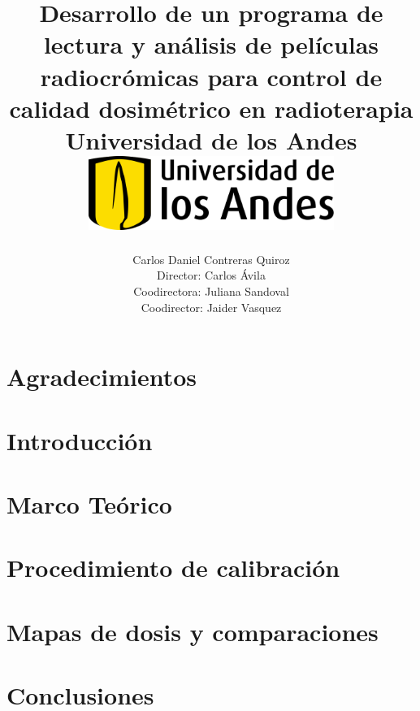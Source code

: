 \documentclass[12pt]{report}
\title 
{
	{Desarrollo de un programa de lectura y análisis de películas radiocrómicas para control de calidad dosimétrico en radioterapia}\\
	{\large Universidad de los Andes}\\
	\vspace{1.5cm}
	{\includegraphics[width = 0.6\textwidth]{logo.png}}	
}
\author{Carlos Daniel Contreras Quiroz\\[1cm]{\small Director: Carlos \'Avila}\\[1cm]{\small Coodirectora: Juliana Sandoval}\\[1cm]{\small Coodirector: Jaider Vasquez}}
\newenvironment{dedication}
  {\clearpage           %
   \thispagestyle{empty}%
   \vspace*{\stretch{1}}%
   \raggedleft          %
  }
  {\par %
   \vspace{\stretch{3}} %
   \clearpage           %
  }
\theoremstyle{definition}
\begin{document}

\maketitle


\begin{abstract}



\end{abstract}

\begin{otherlanguage}{english}
\begin{abstract}


\end{abstract}
\end{otherlanguage}

\newpage

\chapter*{Agradecimientos}


\tableofcontents

\listoffigures

\chapter{Introducción}


\chapter{Marco Teórico}\label{chp:teorico}


\chapter{Procedimiento de calibración}\label{chp:Calibracion}


\chapter{Mapas de dosis y comparaciones}\label{chp:comparaciones}



\chapter{Conclusiones}


\nocite{*}


\end{document}
